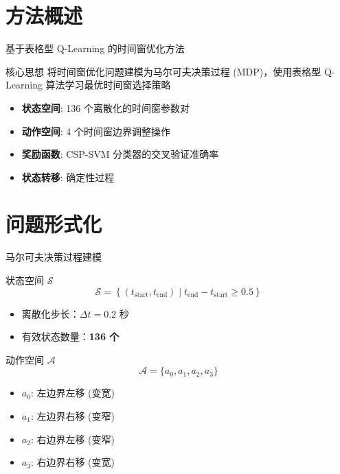 
\section{方法概述}

\begin{frame}{基于表格型 Q-Learning 的时间窗优化方法}
    \begin{block}{核心思想}
        将时间窗优化问题建模为马尔可夫决策过程 (MDP)，使用表格型 Q-Learning 算法学习最优时间窗选择策略
    \end{block}
    \vspace{0.3cm}
    \begin{itemize}
        \item \textbf{状态空间}: 136 个离散化的时间窗参数对
        \item \textbf{动作空间}: 4 个时间窗边界调整操作
        \item \textbf{奖励函数}: CSP-SVM 分类器的交叉验证准确率
        \item \textbf{状态转移}: 确定性过程
    \end{itemize}
\end{frame}

\section{问题形式化}

\begin{frame}{马尔可夫决策过程建模}
    \begin{block}{状态空间 $\mathcal{S}$}
        \[
        \mathcal{S} = \left\{ (t_{\text{start}}, t_{\text{end}}) \mid t_{\text{end}} - t_{\text{start}} \geq 0.5 \right\}
        \]
        \begin{itemize}
            \item 离散化步长：$\Delta t = 0.2$ 秒
            \item 有效状态数量：\textbf{136 个}
        \end{itemize}
    \end{block}
    
    \vspace{0.3cm}
    \begin{block}{动作空间 $\mathcal{A}$}
        \[
        \mathcal{A} = \{a_0, a_1, a_2, a_3\}
        \]
        \begin{itemize}
            \item $a_0$: 左边界左移 (变宽)
            \item $a_1$: 左边界右移 (变窄)
            \item $a_2$: 右边界左移 (变窄)
            \item $a_3$: 右边界右移 (变宽)
        \end{itemize}
    \end{block}
\end{frame}

